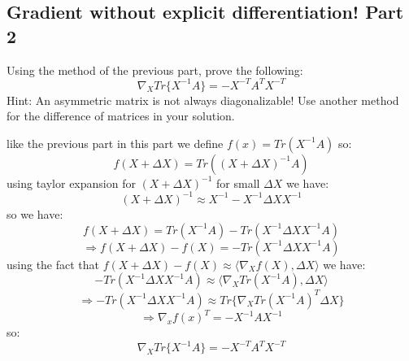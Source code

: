 \subsection{ Gradient without explicit differentiation! Part 2}
Using the method of the previous part, prove the following:
$$\nabla_X Tr\{X^{-1}A\} = -X^{-T}A^TX^{-T}$$
Hint: An asymmetric matrix is not always diagonalizable! Use another method for the difference
of matrices in your solution.
\begin{qsolve}
	\begin{qsolve}[]
		like the previous part in this part we define $f(x) = Tr(X^{-1}A)$ so:
		$$f(X+\Delta X) = Tr((X+\Delta X)^{-1}A)$$
		using taylor expansion for $(X+\Delta X) ^{-1}$ for small $\Delta X$ we have:
		$$(X+\Delta X) ^{-1} \approx X^{-1} - X^{-1}\Delta X X^{-1}$$
		so we have:
		$$f(X+\Delta X) = Tr(X^{-1}A) - Tr(X^{-1}\Delta X X^{-1}A)$$
		$$\Rightarrow f(X+\Delta X) - f(X) = -Tr(X^{-1}\Delta X X^{-1}A)$$
		using the fact that $f(X+\Delta X) - f(X) \approx \langle \nabla_X f(X) , \Delta X\rangle $ we have:
		$$-Tr(X^{-1}\Delta X X^{-1}A) \approx \langle \nabla_X Tr(X^{-1}A) , \Delta X\rangle $$
		$$\Rightarrow -Tr(X^{-1}\Delta X X^{-1}A) \approx Tr\{\nabla_X Tr(X^{-1}A)^T \Delta X\}$$
		$$\Rightarrow \nabla_x f(x)^T = -X^{-1}A X^{-1}$$
		so:
		$$\nabla_X Tr\{X^{-1}A\} = -X^{-T}A^TX^{-T}$$
	\end{qsolve}
\end{qsolve}



